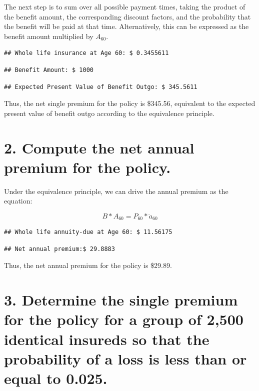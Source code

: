 \documentclass[
]{article}
\begin{document}
The next step is to sum over all possible payment times, taking the
product of the benefit amount, the corresponding discount factors, and
the probability that the benefit will be paid at that time.
Alternatively, this can be expressed as the benefit amount multiplied by
\(A_{60}\).

\begin{verbatim}
## Whole life insurance at Age 60: $ 0.3455611
\end{verbatim}

\begin{verbatim}
## Benefit Amount: $ 1000
\end{verbatim}

\begin{verbatim}
## Expected Present Value of Benefit Outgo: $ 345.5611
\end{verbatim}

Thus, the net single premium for the policy is \$345.56, equivalent to
the expected present value of benefit outgo according to the equivalence
principle.

\hypertarget{compute-the-net-annual-premium-for-the-policy.}{%
\section{2. Compute the net annual premium for the
policy.}\label{compute-the-net-annual-premium-for-the-policy.}}

Under the equivalence principle, we can drive the annual premium as the
equation:

\[
B * A_{60} = P_{60}*\ddot{a}_{{60}}
\]

\begin{verbatim}
## Whole life annuity-due at Age 60: $ 11.56175
\end{verbatim}

\begin{verbatim}
## Net annual premium:$ 29.8883
\end{verbatim}

Thus, the net annual premium for the policy is \$29.89.

\hypertarget{determine-the-single-premium-for-the-policy-for-a-group-of-2500-identical-insureds-so-that-the-probability-of-a-loss-is-less-than-or-equal-to-0.025.}{%
\section{3. Determine the single premium for the policy for a group of
2,500 identical insureds so that the probability of a loss is less than
or equal to
0.025.}\label{determine-the-single-premium-for-the-policy-for-a-group-of-2500-identical-insureds-so-that-the-probability-of-a-loss-is-less-than-or-equal-to-0.025.}}
\end{document}
